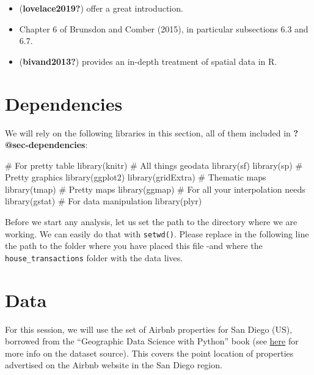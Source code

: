\documentclass[
  letterpaper,
  krantz2]{style/krantz}
\newenvironment{Shaded}{\begin{snugshade}}{\end{snugshade}}
\newcommand{\CommentTok}[1]{\textcolor[rgb]{0.37,0.37,0.37}{#1}}
\newcommand{\FunctionTok}[1]{\textcolor[rgb]{0.28,0.35,0.67}{#1}}
\newcommand{\NormalTok}[1]{\textcolor[rgb]{0.00,0.23,0.31}{#1}}
\providecommand{\tightlist}{%
  \setlength{\itemsep}{0pt}\setlength{\parskip}{0pt}}\usepackage{longtable,booktabs,array}
\begin{document}
\begin{itemize}
\tightlist
\item
  (\textbf{lovelace2019?}) offer a great introduction.
\item
  Chapter 6 of Brunsdon and Comber (2015), in particular subsections 6.3
  and 6.7.
\item
  (\textbf{bivand2013?}) provides an in-depth treatment of spatial data
  in R.
\end{itemize}

\hypertarget{dependencies-1}{%
\section{Dependencies}\label{dependencies-1}}

We will rely on the following libraries in this section, all of them
included in \textbf{?@sec-dependencies}:

\begin{Shaded}
\begin{Highlighting}[]
\CommentTok{\# For pretty table}
\FunctionTok{library}\NormalTok{(knitr)}
\CommentTok{\# All things geodata}
\FunctionTok{library}\NormalTok{(sf)}
\FunctionTok{library}\NormalTok{(sp)}
\CommentTok{\# Pretty graphics}
\FunctionTok{library}\NormalTok{(ggplot2)}
\FunctionTok{library}\NormalTok{(gridExtra)}
\CommentTok{\# Thematic maps}
\FunctionTok{library}\NormalTok{(tmap)}
\CommentTok{\# Pretty maps}
\FunctionTok{library}\NormalTok{(ggmap)}
\CommentTok{\# For all your interpolation needs}
\FunctionTok{library}\NormalTok{(gstat)}
\CommentTok{\# For data manipulation}
\FunctionTok{library}\NormalTok{(plyr)}
\end{Highlighting}
\end{Shaded}

Before we start any analysis, let us set the path to the directory where
we are working. We can easily do that with \texttt{setwd()}. Please
replace in the following line the path to the folder where you have
placed this file -and where the \texttt{house\_transactions} folder with
the data lives.

\hypertarget{data}{%
\section{Data}\label{data}}

For this session, we will use the set of Airbnb properties for San Diego
(US), borrowed from the ``Geographic Data Science with Python'' book
(see
\href{https://geographicdata.science/book/data/airbnb/regression_cleaning.html}{here}
for more info on the dataset source). This covers the point location of
properties advertised on the Airbnb website in the San Diego region.
\end{document}
